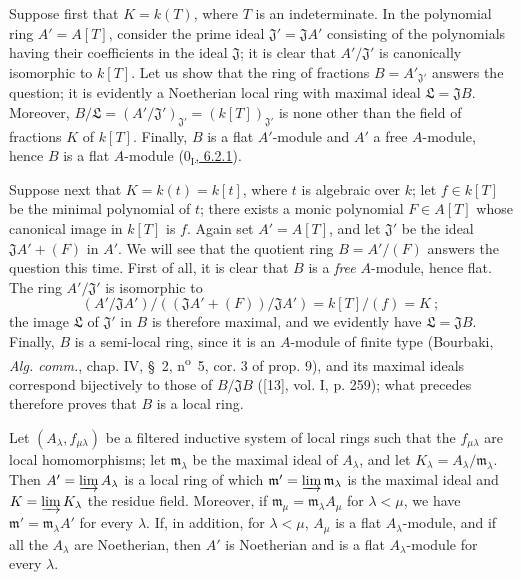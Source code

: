\begin{env}[10.3.1.1]
\label{0.10.3.1.1}
Suppose first that $K=k(T)$, where $T$ is an indeterminate. In the
polynomial ring $A'=A[T]$, consider the prime ideal
$\mathfrak J'=\mathfrak J A'$ consisting of the
polynomials having their coefficients in the ideal $\mathfrak J$; it is clear
that $A'/\mathfrak J'$ is canonically isomorphic to $k[T]$. Let us show that
the ring of fractions $B=A'_{\mathfrak J'}$ answers the question; it is
evidently a Noetherian local ring with maximal ideal
$\mathfrak L=\mathfrak J B$. Moreover,
$B/\mathfrak L=(A'/\mathfrak J')_{\mathfrak J'}=(k[T])_{\mathfrak J'}$
is none other than the field of fractions $K$ of $k[T]$. Finally, $B$ is a
flat $A'$-module and $A'$ a free $A$-module, hence $B$ is a flat $A$-module
(\hyperref[0.6.2.1]{$0_{\mathrm I}$, 6.2.1}).
\end{env}

\begin{env}[10.3.1.2]
\label{0.10.3.1.2}
Suppose next that $K=k(t)=k[t]$, where $t$ is algebraic over $k$; let
$f\in k[T]$ be the minimal polynomial of $t$; there exists a monic polynomial
$F\in A[T]$ whose canonical image in $k[T]$ is $f$. Again set
$A'=A[T]$, and let $\mathfrak J'$ be the ideal $\mathfrak J A'+(F)$ in $A'$.
We will see that the quotient ring $B=A'/(F)$ answers the question this
time. First of all, it is clear that $B$ is a \emph{free} $A$-module,
hence flat. The ring $A'/\mathfrak J'$ is isomorphic to
\[
  (A'/\mathfrak J A')/((\mathfrak J A'+(F))/\mathfrak J A')
  =k[T]/(f)=K~;
\]
the image $\mathfrak L$ of $\mathfrak J'$ in $B$ is therefore maximal, and we
evidently have $\mathfrak L=\mathfrak J B$. Finally, $B$ is a semi-local ring,
since it is an $A$-module of finite type (Bourbaki, \emph{Alg. comm.}, chap.
IV, \S~2, n\textsuperscript{o}~5, cor. 3 of prop. 9), and its maximal ideals correspond bijectively to those of $B/\mathfrak J B$
([13], vol. I, p. 259); what precedes therefore proves that $B$ is a
local ring.
\end{env}

\begin{lemma}[10.3.1.3]
\label{0.10.3.1.3}
Let $(A_\lambda,f_{\mu\lambda})$ be a filtered inductive system of local
rings such that the $f_{\mu\lambda}$ are local homomorphisms; let
$\mathfrak m_\lambda$ be the maximal ideal of $A_\lambda$, and let
$K_\lambda=A_\lambda/\mathfrak m_\lambda$. Then
$A'=\varinjlim A_\lambda$ is a local ring of which
$\mathfrak m'=\varinjlim\mathfrak m_\lambda$ is the maximal ideal and
$K=\varinjlim K_\lambda$ the residue field. Moreover, if
$\mathfrak m_\mu=\mathfrak m_\lambda A_\mu$ for $\lambda<\mu$, we have
$\mathfrak m'=\mathfrak m_\lambda A'$ for every $\lambda$. If, in addition, for
$\lambda<\mu$, $A_\mu$ is a flat $A_\lambda$-module, and if all the
$A_\lambda$ are Noetherian, then $A'$ is Noetherian and is a flat
$A_\lambda$-module for every $\lambda$.
\end{lemma}

